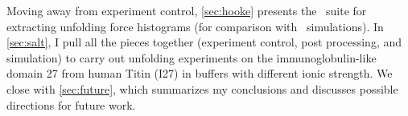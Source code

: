 Moving away from experiment control, \cref{sec:hooke} presents the
\Hooke\ suite for extracting unfolding force histograms (for
comparison with \sawsim\ simulations).  In \cref{sec:salt}, I pull all
the pieces together (experiment control, post processing, and
simulation) to carry out unfolding experiments on the
immunoglobulin-like domain 27 from human Titin (I27) in buffers with
different ionic strength.  We close with \cref{sec:future}, which
summarizes my conclusions and discusses possible directions for future
work.
